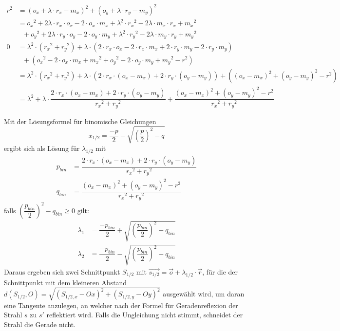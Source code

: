 \documentclass[reducespace,stylepage,semiarbeit]{spezidoc}
\begin{document}
\begin{equation*}
\begin{split}
r^2 &= {(o_x + \lambda \cdot r_x - m_x)}^2 + {(o_y + \lambda \cdot r_y - m_y)}^2 \\
 &= {o_x}^2 + 2\lambda\cdot r_x \cdot o_x - 2 \cdot o_x \cdot m_x + \lambda^2 \cdot {r_x}^2 - 2\lambda \cdot m_x \cdot r_x + {m_x}^2 \\
 & ~~~+{o_y}^2 + 2\lambda\cdot r_y \cdot o_y - 2 \cdot o_y \cdot m_y + \lambda^2 \cdot {r_y}^2 - 2\lambda \cdot m_y \cdot r_y + {m_y}^2 \\
0 &= \lambda^2 \cdot ({r_x}^2 + {r_y}^2) + \lambda \cdot (2 \cdot r_x \cdot o_x - 2 \cdot r_x \cdot m_x + 2 \cdot r_y \cdot m_y - 2 \cdot r_y \cdot m_y) \\
 & ~~~+({o_x}^2 - 2 \cdot o_x \cdot m_x + {m_x}^2 + {o_y}^2 - 2 \cdot o_y \cdot m_y + {m_y}^2 - r^2) \\
 &= \lambda^2 \cdot ({r_x}^2 + {r_y}^2) + \lambda \cdot (2 \cdot r_x \cdot (o_x - m_x) + 2 \cdot r_y \cdot (o_y - m_y)) + ({(o_x - m_x)}^2 + {(o_y - m_y)}^2 - r^2) \\
 &= \lambda^2 + \lambda \cdot \dfrac{2 \cdot r_x \cdot (o_x - m_x) + 2 \cdot r_y \cdot (o_y - m_y)}{{r_x}^2 + {r_y}^2} + \dfrac{{(o_x - m_x)}^2 + {(o_y - m_y)}^2 - r^2}{{r_x}^2 + {r_y}^2}
\end{split}
\end{equation*}

Mit der Lösungsformel für binomische Gleichungen 
\begin{equation*}
x_{1/2} = \dfrac{-p}{2} \pm \sqrt{{(\dfrac{p}{2})}^2 - q}
\end{equation*}
ergibt sich als Lösung für $\lambda_{1/2}$ mit
\begin{equation*}
\begin{split}
p_{bin} &= \dfrac{2 \cdot r_x \cdot (o_x - m_x) + 2 \cdot r_y \cdot (o_y - m_y)}{{r_x}^2 + {r_y}^2} \\
q_{bin} &= \dfrac{{(o_x - m_x)}^2 + {(o_y - m_y)}^2 - r^2}{{r_x}^2 + {r_y}^2}
\end{split}
\end{equation*}
falls ${(\dfrac{p_{bin}}{2})}^2 - q_{bin} \geq 0$ gilt:
\begin{equation*}
\begin{split}
\lambda_1 &= \dfrac{-p_{bin}}{2} + \sqrt{{(\dfrac{p_{bin}}{2})}^2 - q_{bin}} \\
\lambda_2 &= \dfrac{-p_{bin}}{2} - \sqrt{{(\dfrac{p_{bin}}{2})}^2 - q_{bin}}
\end{split}
\end{equation*}
Daraus ergeben sich zwei Schnittpunkt $S_{1/2}$ mit $\vec{s_{1/2}} = \vec{o} + \lambda_{1/2} \cdot \vec{r}$, für die der Schnittpunkt mit dem kleineren Abstand $d(S_{1/2}, O) = \sqrt{{(S_{1/2, x} - Ox)}^2 + {(S_{1/2, y} - Oy)}^2}$ ausgewählt wird, um daran eine Tangente anzulegen, an welcher nach der Formel für Geradenreflexion der Strahl $s$ zu $s'$ reflektiert wird. Falls die Ungleichung nicht stimmt, schneidet der Strahl die Gerade nicht.
\end{document}
